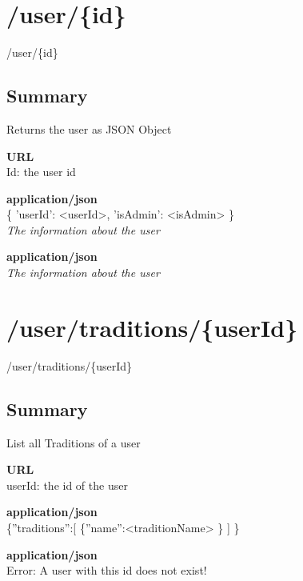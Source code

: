 \documentclass[11pt,fleqn,openany]{book} %
\begin{document}
\section{/user/\{id\}}
\begin{get}
/user/\{id\}
\end{get}

\subsection*{Summary}
Returns the user as JSON Object
\begin{parameter}\textbf{URL}\\
 Id: the user id
\end{parameter}
\begin{return}[OK]
\textbf{application/json}\\
\{ 'userId': <userId>, 'isAdmin': <isAdmin> \}\\
\textit{The information about the user}
\end{return}
\begin{return}
\textbf{application/json}\\
\textit{The information about the user}
\end{return}

\section{/user/traditions/\{userId\}}
\begin{get}
/user/traditions/\{userId\}
\end{get}

\subsection*{Summary}
List all Traditions of a user
\begin{parameter}\textbf{URL}\\
userId: the id of the user \\
\end{parameter}
\begin{return}[OK]
\textbf{application/json}\\
\{''traditions'':[ \{''name'':<traditionName> \} ] \}
\end{return}
\begin{return}
\textbf{application/json}\\
Error: A user with this id does not exist!
\end{return}
\end{document}
